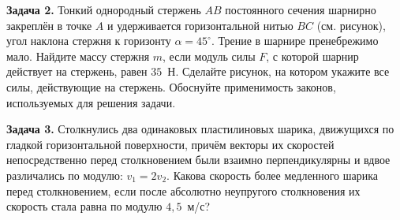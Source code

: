 \begin{taskbasic}[code={\label{task:mechanics_v1_n26}}]
\textbf{Задача 2.} Тонкий однородный стержень $AB$ постоянного сечения шарнирно закреплён в точке $A$ и удерживается горизонтальной нитью $BC$ (см. рисунок), угол наклона стержня к горизонту $\alpha = 45^{\circ}$. Трение в шарнире пренебрежимо мало. Найдите массу стержня $m$, если модуль силы $F$, с которой шарнир действует на стержень, равен $35$~Н. Сделайте рисунок, на котором укажите все силы, действующие на стержень. Обоснуйте применимость законов, используемых для решения задачи.

\nopagebreak\smallskip
\begin{center}
\end{center}

\end{taskbasic}

\begin{taskbasic}[code={\label{task:mechanics_v2_n22}}]
\textbf{Задача 3.} Столкнулись два одинаковых пластилиновых шарика, движущихся по гладкой горизонтальной поверхности, причём векторы их скоростей непосредственно перед столкновением были взаимно перпендикулярны и вдвое различались по модулю: $v_1 = 2v_2$. Какова скорость более медленного шарика перед столкновением, если после абсолютно неупругого столкновения их скорость стала равна по модулю $4{,}5$~м/с?

\end{taskbasic}

